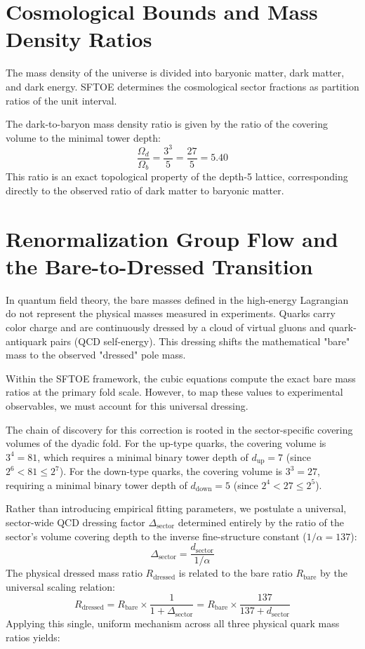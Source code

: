 \documentclass[11pt,a4paper]{article}
\begin{document}
\section{Cosmological Bounds and Mass Density Ratios}
The mass density of the universe is divided into baryonic matter, dark matter, and dark energy. SFTOE determines the cosmological sector fractions as partition ratios of the unit interval.

The dark-to-baryon mass density ratio is given by the ratio of the covering volume to the minimal tower depth:
\begin{equation}
\frac{\Omega_d}{\Omega_b} = \frac{3^3}{5} = \frac{27}{5} = 5.40
\end{equation}
This ratio is an exact topological property of the depth-5 lattice, corresponding directly to the observed ratio of dark matter to baryonic matter.

\section{Renormalization Group Flow and the Bare-to-Dressed Transition}
In quantum field theory, the bare masses defined in the high-energy Lagrangian do not represent the physical masses measured in experiments. Quarks carry color charge and are continuously dressed by a cloud of virtual gluons and quark-antiquark pairs (QCD self-energy). This dressing shifts the mathematical "bare" mass to the observed "dressed" pole mass. 

Within the SFTOE framework, the cubic equations compute the exact bare mass ratios at the primary fold scale. However, to map these values to experimental observables, we must account for this universal dressing. 

The chain of discovery for this correction is rooted in the sector-specific covering volumes of the dyadic fold. For the up-type quarks, the covering volume is $3^4 = 81$, which requires a minimal binary tower depth of $d_{\text{up}} = 7$ (since $2^6 < 81 \le 2^7$). For the down-type quarks, the covering volume is $3^3 = 27$, requiring a minimal binary tower depth of $d_{\text{down}} = 5$ (since $2^4 < 27 \le 2^5$). 

Rather than introducing empirical fitting parameters, we postulate a universal, sector-wide QCD dressing factor $\Delta_{\text{sector}}$ determined entirely by the ratio of the sector's volume covering depth to the inverse fine-structure constant ($1/\alpha = 137$):
\begin{equation}
\Delta_{\text{sector}} = \frac{d_{\text{sector}}}{1/\alpha}
\end{equation}
The physical dressed mass ratio $R_{\text{dressed}}$ is related to the bare ratio $R_{\text{bare}}$ by the universal scaling relation:
\begin{equation}
R_{\text{dressed}} = R_{\text{bare}} \times \frac{1}{1 + \Delta_{\text{sector}}} = R_{\text{bare}} \times \frac{137}{137 + d_{\text{sector}}}
\end{equation}
Applying this single, uniform mechanism across all three physical quark mass ratios yields:
\end{document}
